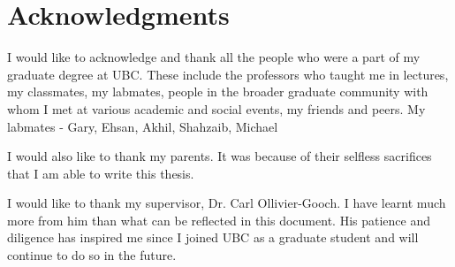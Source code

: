 
\chapter{Acknowledgments}

I would like to acknowledge and thank all the people who were a part of my graduate degree at UBC. These include the professors who taught me in lectures, my classmates, my labmates, people in the broader graduate community with whom I met at various academic and social events, my friends and peers. My labmates - Gary, Ehsan, Akhil, Shahzaib, Michael

I would also like to thank my parents. It was because of their selfless sacrifices that I am able to write this thesis.

I would like to thank my supervisor, Dr. Carl Ollivier-Gooch. I have learnt much more from him than what can be reflected in this document. His patience and diligence has inspired me since I joined UBC as a graduate student and will continue to do so in the future.




